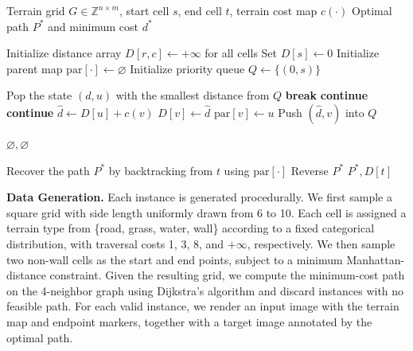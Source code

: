 \documentclass{llmxive}
\begin{document}
\begin{algorithm}[t]
\caption{Verification via Dijkstra Search}
\label{alg:dijkstra_verify}
\begin{algorithmic}[1]
\Require Terrain grid \(G \in \mathbb{Z}^{n \times m}\), start cell \(s\), end cell \(t\), terrain cost map \(c(\cdot)\)
\Ensure Optimal path \(P^*\) and minimum cost \(d^*\)

\State Initialize distance array \(D[r,c] \leftarrow +\infty\) for all cells
\State Set \(D[s] \leftarrow 0\)
\State Initialize parent map \(\mathrm{par}[\cdot] \leftarrow \varnothing\)
\State Initialize priority queue \(Q \leftarrow \{(0, s)\}\)

    \State Pop the state \((d, u)\) with the smallest distance from \(Q\)
        \State \textbf{break}
    \EndIf
        \State \textbf{continue}
    \EndIf
            \State \textbf{continue}
        \EndIf
        \State \(\hat{d} \leftarrow D[u] + c(v)\)
            \State \(D[v] \leftarrow \hat{d}\)
            \State \(\mathrm{par}[v] \leftarrow u\)
            \State Push \((\hat{d}, v)\) into \(Q\)
        \EndIf
    \EndFor
\EndWhile

    \State \Return \(\varnothing, \varnothing\)
\EndIf

\State Recover the path \(P^*\) by backtracking from \(t\) using \(\mathrm{par}[\cdot]\)
\State Reverse \(P^*\)
\State \Return \(P^*, D[t]\)
\end{algorithmic}
\end{algorithm}

\textbf{Data Generation.}
Each instance is generated procedurally. We first sample a square grid with
side length uniformly drawn from 6 to 10. Each cell is assigned a terrain type
from \{road, grass, water, wall\} according to a fixed categorical
distribution, with traversal costs 1, 3, 8, and \(+\infty\), respectively. We
then sample two non-wall cells as the start and end points, subject to a
minimum Manhattan-distance constraint. Given the resulting grid, we compute the
minimum-cost path on the 4-neighbor graph using Dijkstra's algorithm and
discard instances with no feasible path. For each valid instance, we render an
input image with the terrain map and endpoint markers, together with a target
image annotated by the optimal path.
\end{document}
